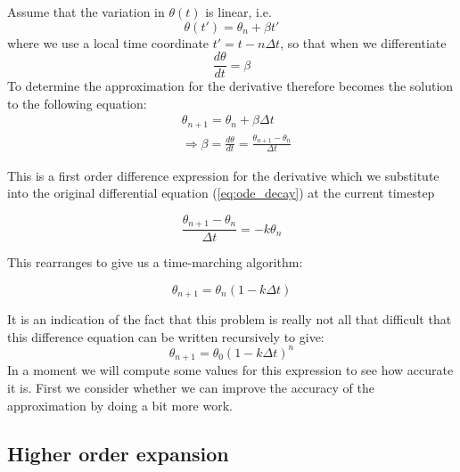 \documentclass[10pt]{article}
\begin{document}
	 Assume that the variation in $\theta(t)$ is linear, i.e.
	 	\begin{equation}
	 		\theta(t') = \theta_n + \beta t'
	 	\end{equation}
	 where we use a local time coordinate $t' = t - n\Delta t$, so that
	 when we differentiate
	 	\begin{equation}
	 		\frac{d \theta}{dt} = \beta
	 	\end{equation}
	To determine the approximation for the derivative therefore
	becomes the solution to the following equation:
		\begin{equation}
			\begin{split}
				& \theta_{n+1} = \theta_n + \beta \Delta t \\
				& \Rightarrow	\beta = \frac{d \theta}{dt} = \frac{\theta_{n+1} - \theta_n}{\Delta t}
			\end{split}
		\end{equation}
		
	This is a first order difference expression for the derivative which we
	substitute into the original differential equation (\ref{eq:ode_decay}) at
	the current timestep
	
		\begin{equation}
			\frac{\theta_{n+1} - \theta_n}{\Delta t} = - k \theta_n
		\end{equation}
		
	This rearranges to give us a time-marching algorithm:
	
		\begin{equation}
			\theta_{n+1} = \theta_n (1-k \Delta t)
		\end{equation}
		
	It is an indication of the fact that this problem is really not all that difficult
	that this difference equation can be written recursively
	to give:
		\begin{equation}
			\theta_{n+1} = \theta_0 (1-k \Delta t)^n
		\end{equation}	
	In a moment we will compute some values for this expression to see how
	accurate it is. First we consider whether we can improve the accuracy of the
	approximation by doing a bit more work.
	
	\subsection{Higher order expansion}
	
\end{document}
